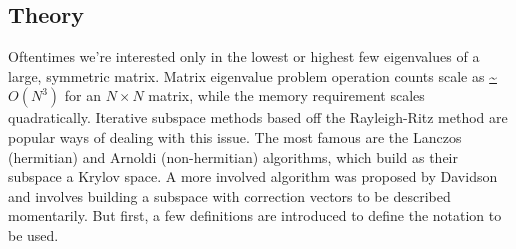 \documentclass{revtex4}
\begin{document}
\subsection{Theory}
Oftentimes we're interested only in the lowest or highest few eigenvalues of a large, symmetric matrix. Matrix eigenvalue problem operation counts scale as \url{~}$O(N^3)$ for an $N \times N$ matrix, while the memory requirement scales quadratically. Iterative subspace methods based off the Rayleigh-Ritz method are popular ways of dealing with this issue. The most famous are the Lanczos (hermitian) and Arnoldi (non-hermitian) algorithms, which build as their subspace a Krylov space. A more involved algorithm was proposed by Davidson\cite{Davidson1975} and involves building a subspace with correction vectors to be described momentarily. But first, a few definitions are introduced to define the notation to be used.
\end{document}
